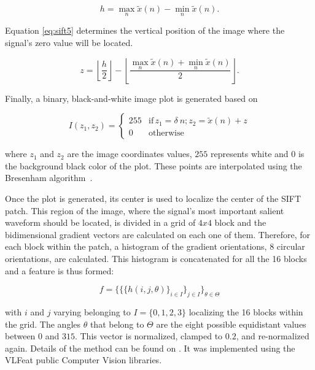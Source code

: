 \documentclass[brainsci,article,submit,moreauthors,pdftex,10pt,a4paper]{mdpi}
\begin{document}
\begin{equation}
h = \max_{n} \tilde{x}(n) - \min_{n} \tilde{x}(n).
\label{eq:sift4}
\end{equation}

Equation \ref{eq:sift5} determines the vertical position of the image where the signal's zero value will be located.

\begin{equation}
z = \left\lfloor \frac{h}{2} \right\rfloor - \left\lfloor \frac{\max_{n} \tilde{x}(n) + \min_{n} \tilde{x}(n)}{2} \right\rfloor.
\label{eq:sift5}
\end{equation}

Finally, a binary, black-and-white image plot is generated based on

\begin{equation}
I(z_1,z_2) = \left\{ \begin{array}{rl}
255 & \text{if} \,  z_1 = \delta \  n; \! z_2 = \tilde{x}(n) + z \\
0   & \mbox{otherwise}
\end{array}\right.
\label{eq:sift6}
\end{equation}

\noindent where $z_1$ and $z_2$ are the image coordinates values, $255$ represents white and $0$ is the background black color of the plot.  These points are interpolated using the Bresenham algorithm~\citep{Ramele2016}.

Once the plot is generated, its center is used to localize the center of the SIFT patch. This region of the image, where the signal's most important salient waveform should be located, is divided in a grid of $4 x 4$ block and the bidimensional gradient vectors are calculated on each one of them.  Therefore, for each block within the patch, a histogram of the gradient orientations, 8 circular orientations, are calculated.  This histogram is concatenated for all the 16 blocks and a feature is thus formed:

\begin{equation}
f = {\bigg \{ \bigg \{  \bigg \{ h(i,j,\theta) \bigg \}_{i \in I }  \bigg \}_{j \in I} \bigg \}_{\theta \in \Theta} }
\label{eq:sift7}
\end{equation}

\noindent with $i$ and $j$ varying belonging to $I = \{ 0,1,2,3 \} $ localizing the 16 blocks within the grid. The angles $\theta$ that belong to $\Theta$ are the eight possible equidistant values between $0$ and $315$.  This vector is normalized, clamped to $0.2$, and re-normalized again.   Details of the method can be found on \citep{Ramele2016,Lowe2004}.  It was implemented using the VLFeat  \citep{Vedaldi2010} public Computer Vision libraries.
\end{document}
